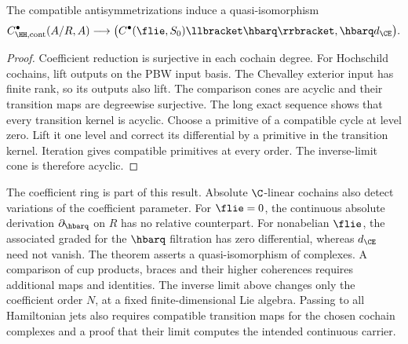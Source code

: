 \begin{corollary}\label{cor:vol2-formal-relative-rees}
The compatible antisymmetrizations induce a quasi-isomorphism
\[
 C^\bullet_{\HH,\mathrm{cont}}(A/R,A)
 \longrightarrow
 \bigl(C^\bullet(\flie,S_0)\llbracket\hbarq\rrbracket,
                    \hbarq d_{\CE}\bigr).
\]
\end{corollary}
\begin{proof}
Coefficient reduction is surjective in each cochain degree.
For Hochschild cochains, lift outputs on the PBW input basis.
The Chevalley exterior input has finite rank, so its outputs also lift.
The comparison cones are acyclic and their transition maps are degreewise surjective.
The long exact sequence shows that every transition kernel is acyclic.
Choose a primitive of a compatible cycle at level zero.
Lift it one level and correct its differential by a primitive in the transition kernel.
Iteration gives compatible primitives at every order.
The inverse-limit cone is therefore acyclic.
\end{proof}

The coefficient ring is part of this result.
Absolute $\C$-linear cochains also detect variations of the coefficient parameter.
For $\flie=0$, the continuous absolute derivation $\partial_{\hbarq}$
on $R$ has no relative counterpart.
For nonabelian $\flie$, the associated graded for the $\hbarq$ filtration
has zero differential, whereas $d_{\CE}$ need not vanish.
The theorem asserts a quasi-isomorphism of complexes. A comparison of
cup products, braces and their higher coherences requires additional
maps and identities. The inverse
limit above changes only the coefficient order $N$, at a fixed
finite-dimensional Lie algebra. Passing to all Hamiltonian jets also
requires compatible transition maps for the chosen cochain complexes
and a proof that their limit computes the intended continuous carrier.
